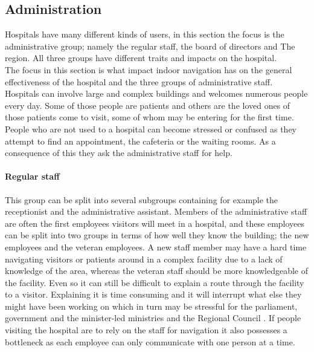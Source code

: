 \subsection{Administration}

Hospitals have many different kinds of users, in this section the focus is the administrative group; namely the regular staff, the board of directors and The region. All three groups have different traits and impacts on the hospital. \\ The focus in this section is what impact indoor navigation has on the general effectiveness of the hospital and the three groups of administrative staff.\\
Hospitals can involve large and complex buildings \cite{wifi_navigation_ca} and welcomes numerous people every day. Some of those people are patients and others are the loved ones of those patients come to visit, some of whom may be entering for the first time. People who are not used to a hospital can become stressed or confused as they attempt to find an appointment, the cafeteria or the waiting rooms. As a consequence of this they ask the administrative staff for help. \cite{Frivillige_guider}

\paragraph{Regular staff}
This group can be split into several subgroups containing for example the receptionist and the administrative assistant. Members of the administrative staff are often the first employees visitors will meet in a hospital, and these employees can be split into two groups in terms of how well they know the building; the new employees and the veteran employees. A new staff member may have a hard time navigating visitors or patients around in a complex facility due to a lack of knowledge of the area, whereas the veteran staff should be more knowledgeable of the facility. Even so it can still be difficult to explain a route through the facility to a visitor. Explaining it is time consuming and it will interrupt what else they might have been working on which in turn may be stressful for the parliament, government and the minister-led ministries and the Regional Council \cite{arbejdsmiljo_ca}. If people visiting the hospital are to rely on the staff for navigation it also possesses a bottleneck as each employee can only communicate with one person at a time.

